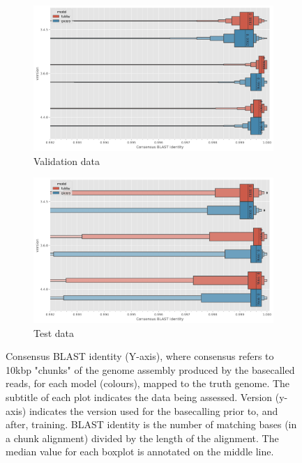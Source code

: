 \begin{figure}
     \centering
     \begin{subfigure}[b]{0.9\textwidth}
        \includegraphics[width=1\linewidth]{Chapter4/Figs/eval_consensus_blast_identity.png}
        \centering
        \caption{Validation data}
        \label{fig:eval-consensus-blast}
     \end{subfigure}
     \hfill
     \begin{subfigure}[b]{0.9\textwidth}
         \centering
        \includegraphics[width=1\linewidth]{Chapter4/Figs/test_consensus_blast_identity.png}
         \caption{Test data}
         \label{fig:test-consensus-blast}
     \end{subfigure}
        \caption{Consensus BLAST identity (Y-axis), where consensus refers to 10kbp "chunks" of the genome assembly produced by the basecalled reads, for each model (colours), mapped to the truth genome. The subtitle of each plot indicates the data being assessed. Version (y-axis) indicates the \guppy{} version used for the basecalling prior to, and after, training. BLAST identity is the number of matching bases (in a chunk alignment) divided by the length of the alignment. The median value for each boxplot is annotated on the middle line.}
        \label{fig:consensus-blast}
\end{figure}

